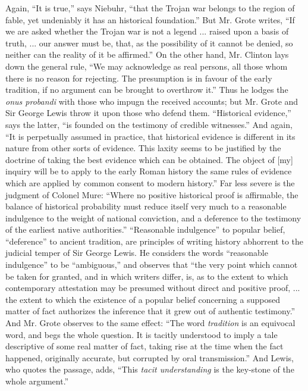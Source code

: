 Again, ``It is true,'' says Niebuhr, ``that the Trojan
war belongs to the region of fable, yet undeniably it has an
historical foundation.'' But Mr. Grote writes, ``If we
are asked whether the Trojan war is not a legend ... raised upon a basis
of truth, ... our answer must be, that, as the possibility of it
cannot be denied, so neither can the reality of it be affirmed.''
On the other hand, Mr. Clinton lays down the general rule, ``We
may acknowledge as real persons, all those whom there is no reason for
rejecting. The presumption is in favour of the early tradition, if no
argument can be brought to overthrow it.'' Thus he lodges the \emph{onus
probandi} with those who impugn the received accounts; but Mr.
Grote and Sir George Lewis throw it upon those who defend them.
``Historical evidence,'' says the latter, ``is founded on
the testimony of credible witnesses.'' And again, ``It is
perpetually assumed in practice, that historical evidence is different
in its nature from other sorts of evidence. This laxity seems to be
justified by the doctrine of taking the best evidence which can be
obtained. The object of [my] inquiry will be to apply to the early
Roman history the same rules of evidence which are applied by common
consent to modern history.'' Far less severe is the judgment of
Colonel Mure: ``Where no positive historical proof is affirmable,
the balance of historical probability must reduce itself very much to
a reasonable indulgence to the weight of national conviction, and a
deference to the testimony of the earliest native authorities.''
``Reasonable indulgence'' to popular belief,
``deference'' to ancient tradition, are principles of writing
history abhorrent to the judicial temper of Sir George Lewis. He
considers the words ``reasonable indulgence'' to be
``ambiguous,'' and observes that ``the very point which cannot be taken for granted, and in which writers differ, is, as
to the extent to which contemporary attestation may be presumed
without direct and positive proof, ... the extent to which the
existence of a popular belief concerning a supposed matter of fact
authorizes the inference that it grew out of authentic
testimony.'' And Mr. Grote observes to the same effect: ``The
word \emph{tradition} is an equivocal word, and begs the whole
question. It is tacitly understood to imply a tale descriptive of some
real matter of fact, taking rise at the time when the fact happened,
originally accurate, but corrupted by oral transmission.'' And
Lewis, who quotes the passage, adds, ``This \emph{tacit understanding}
is the key-stone of the whole argument.''

